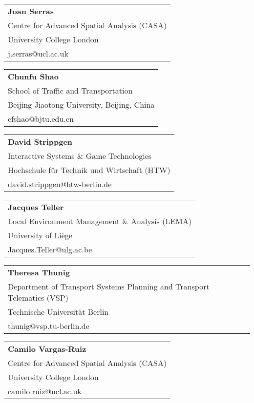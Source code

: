 \begin{tabular}[width=0.48\textwidth]{@{}l}
\textbf{Joan Serras} \\
Centre for Advanced Spatial Analysis (CASA) \\
University College London \\
j.serras@ucl.ac.uk \\
\end{tabular}

\begin{tabular}[width=0.48\textwidth]{@{}l}
\textbf{Chunfu Shao} \\
School of Traffic and Transportation \\
Beijing Jiaotong University, Beijing, China \\
cfshao@bjtu.edu.cn \\
\end{tabular}

\begin{tabular}[width=0.48\textwidth]{@{}l}
\textbf{David Strippgen} \\
Interactive Systems \& Game Technologies \\
Hochschule für Technik und Wirtschaft (HTW) \\
david.strippgen@htw-berlin.de \\
\end{tabular}

\begin{tabular}[width=0.48\textwidth]{@{}l}
\textbf{Jacques Teller} \\
Local Environment Management \& Analysis (LEMA) \\
University of Liège \\
Jacques.Teller@ulg.ac.be \\
\end{tabular}

\begin{tabular}[width=0.48\textwidth]{@{}l}
\textbf{Theresa Thunig} \\
Department of Transport Systems Planning and Transport Telematics (VSP) \\
Technische Universität Berlin \\
thunig@vsp.tu-berlin.de \\
\end{tabular}

\begin{tabular}[width=0.48\textwidth]{@{}l}
\textbf{Camilo Vargas-Ruiz} \\
Centre for Advanced Spatial Analysis (CASA) \\
University College London \\
camilo.ruiz@ucl.ac.uk \\
\end{tabular}

